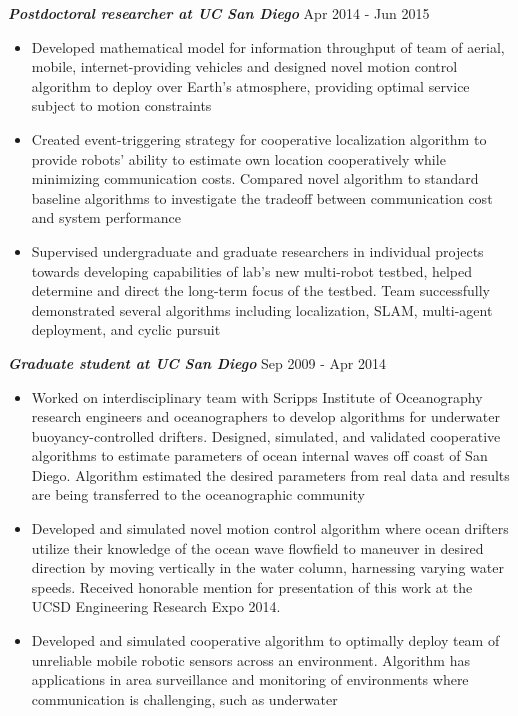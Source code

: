 \documentclass{res}
\begin{document}
\begin{resume}
{\sl \bf Postdoctoral researcher at UC San Diego} \hfill Apr 2014 - Jun 2015 
\begin{itemize}
\item Developed mathematical model for information throughput of team of aerial, mobile, internet-providing vehicles and designed novel motion control algorithm to deploy over Earth's atmosphere, providing optimal service subject to motion constraints
%
\item Created event-triggering strategy for cooperative localization algorithm to provide robots' ability to estimate own location cooperatively while minimizing communication costs. Compared novel algorithm to standard baseline algorithms to investigate the tradeoff between communication cost and system performance
\item Supervised undergraduate and graduate researchers in individual projects towards developing capabilities of lab's new multi-robot testbed, helped determine and direct the long-term focus of the testbed.  Team successfully demonstrated several algorithms including localization, SLAM, multi-agent deployment, and cyclic pursuit
\end{itemize}
\vspace*{-1ex}
{\sl  \bf Graduate student at UC San Diego} \hfill Sep 2009 - Apr 2014 
\begin{itemize}
\item Worked on interdisciplinary team with Scripps Institute of Oceanography research engineers and oceanographers to develop algorithms for underwater buoyancy-controlled drifters. Designed, simulated, and validated cooperative algorithms to estimate parameters of ocean internal waves off coast of San Diego.  Algorithm estimated the desired parameters from real data and results are being transferred to the oceanographic community
\item Developed and simulated novel motion control algorithm where ocean drifters utilize their knowledge of the ocean wave flowfield to maneuver in desired direction by moving vertically in the water column, harnessing varying water speeds. Received honorable mention for presentation of this work at the UCSD Engineering Research Expo 2014.
\item Developed and simulated cooperative algorithm to optimally deploy team of unreliable mobile robotic sensors across an environment. Algorithm has applications in area surveillance and monitoring of environments where communication is challenging, such as underwater
\end{itemize}

\end{resume}
\end{document}
